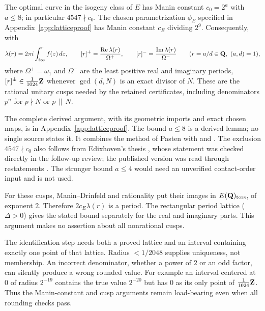 \begin{theorem}\label{thm:manin}
The optimal curve in the isogeny class of $E$ has Manin constant $c_0=2^a$ with $a\le 8$; in particular $4547\nmid c_0$. The chosen parametrization $\phi_E$ specified in Appendix~\ref{app:latticeproof} has Manin constant $c_E$ dividing $2^9$. Consequently, with
\[
\lambda(r)=2\pi i\int_{i\infty}^{r}f(z)\,dz,\qquad [r]^{+}=\frac{\mathrm{Re}\,\lambda(r)}{\Omega^{+}},\qquad [r]^{-}=\frac{\mathrm{Im}\,\lambda(r)}{\Omega^{-}}\qquad(r=a/d\in\Q,\ (a,d)=1),
\]
where $\Omega^+=\omega_1$ and $\Omega^-$ are the least positive real and imaginary periods, $[r]^\pm\in\frac1{1024}\mathbf{Z}$ whenever $\gcd(d,N)$ is an exact divisor of $N$. These are the rational unitary cusps needed by the retained certificates, including denominators $p^n$ for $p\nmid N$ or $p\,\|\,N$.
\end{theorem}
The complete derived argument, with its geometric imports and exact chosen maps, is in Appendix~\ref{app:latticeproof}. The bound $a\le8$ is a derived lemma; no single source states it. It combines the method of Pasten \cite[\S10]{pasten} with \cite[6.12(c)]{cns} and \cite[3.6(a)]{ars}. The exclusion $4547\nmid c_0$ also follows from Edixhoven's thesis \cite[Thm.~4.6.3]{edixhoventhesis}, whose statement was checked directly in the follow-up review; the published version \cite[Thm.~3]{edixhoven} was read through restatements \cite{cns}. The stronger bound $a\le4$ would need an unverified contact-order input and is not used.

For these cusps, Manin--Drinfeld and rationality put their images in $E(\mathbf{Q})_{\rm tors}$, of exponent $2$. Therefore $2c_E\lambda(r)$ is a period. The rectangular period lattice ($\Delta>0$) gives the stated bound separately for the real and imaginary parts. This argument makes no assertion about all nonrational cusps.

\begin{remark}\label{rem:lattice}
The identification step needs both a proved lattice and an interval containing exactly one point of that lattice. Radius $<1/2048$ supplies uniqueness, not membership. An incorrect denominator, whether a power of $2$ or an odd factor, can silently produce a wrong rounded value. For example an interval centered at $0$ of radius $2^{-19}$ contains the true value $2^{-20}$ but has $0$ as its only point of $\frac1{1024}\mathbf{Z}$. Thus the Manin-constant and cusp arguments remain load-bearing even when all rounding checks pass.
\end{remark}
